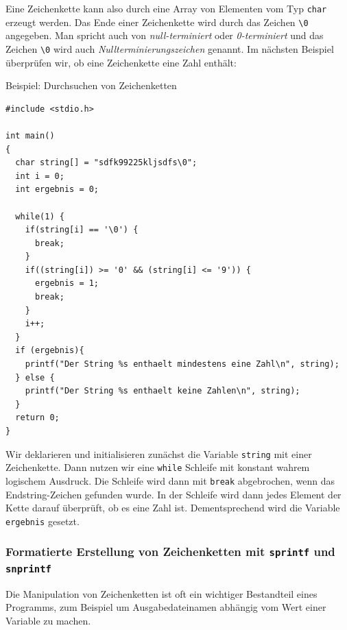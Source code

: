 Eine Zeichenkette kann also durch eine Array von Elementen vom Typ \verb|char| erzeugt werden.
Das Ende einer Zeichenkette wird durch das Zeichen \verb|\0| angegeben.
Man spricht auch von \emph{null-terminiert} oder \emph{0-terminiert} und das Zeichen \verb|\0| wird auch \emph{Nullterminierungszeichen} genannt.
Im nächsten Beispiel überprüfen wir, ob eine Zeichenkette eine Zahl enthält:
\begin{myexampleprogram}{Beispiel: Durchsuchen von Zeichenketten}
\begin{lstlisting}
#include <stdio.h>

int main()
{
  char string[] = "sdfk99225kljsdfs\0";
  int i = 0;
  int ergebnis = 0;

  while(1) {
    if(string[i] == '\0') {
      break;
    }
    if((string[i]) >= '0' && (string[i] <= '9')) {
      ergebnis = 1;
      break;
    }
    i++;
  }
  if (ergebnis){
    printf("Der String %s enthaelt mindestens eine Zahl\n", string);
  } else {
    printf("Der String %s enthaelt keine Zahlen\n", string);
  }
  return 0;
}
\end{lstlisting}
\end{myexampleprogram}
Wir deklarieren und initialisieren zunächst die Variable \texttt{string} mit einer Zeichenkette.
Dann nutzen wir eine \verb|while| Schleife mit konstant wahrem logischem Ausdruck.
Die Schleife wird dann mit \verb|break| abgebrochen, wenn das Endstring-Zeichen gefunden wurde.
In der Schleife wird dann jedes Element der Kette darauf überprüft, ob es eine Zahl ist.
Dementsprechend wird die Variable \verb|ergebnis| gesetzt.

\subsubsection{Formatierte Erstellung von Zeichenketten mit \texttt{sprintf} und \texttt{snprintf}}

Die Manipulation von Zeichenketten ist oft ein wichtiger Bestandteil eines Programms, zum Beispiel um Ausgabedateinamen abhängig vom Wert einer Variable zu machen.

